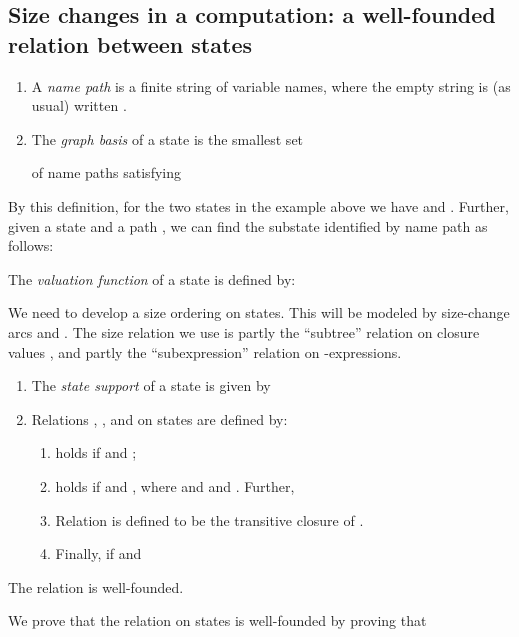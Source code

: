 \documentclass{LMCS}
\newcommand{\be}{\begin{enumerate}}
\newcommand{\ee}{\end{enumerate}}
\newcommand{\bdfn}{\begin{defi}}
\newcommand{\edfn}{\end{defi}}
\newcommand{\blem}{\begin{lem}}
\newcommand{\elem}{\end{lem}}
\theoremstyle{definition}\newtheorem{env}[thm]{Environment}
\begin{document}
\subsection{Size changes in a computation: a well-founded  relation between states}


\bdfn 
\label{def-graph-nodes}\hfill
\be[(1)]

\item A {\em name path} is  a finite string  of 
variable names, where the empty string is (as usual) written . 

\item The {\em graph basis} of a state  is the smallest set  
 
of name paths satisfying

\ee
\edfn
By this definition, for the two states in the example above we have
 and 
. Further, given a state  and a path , we can 
find the substate identified by name path  as follows: 

\bdfn 
\label{def-graph-valuation}
The {\em valuation function}
  of a state  
is defined by: 
 
\edfn
We need to develop a size ordering on states. 
This will  be modeled by size-change arcs
 and .
The size relation we use is partly the ``subtree'' relation on closure 
values , and partly the ``subexpression'' relation on 
-expressions.



\bdfn\label{def-value-decrease}\hfill

\be[(1)]

\item 
The {\em state support}  of 
a state  is given by


\item Relations  
, ,  and  on states are defined by:
\be[]

\item   holds if  and ; 

\item  holds if  and 
, where 
 and  and . Further, \\


\item Relation   is defined to be the transitive closure of 
. 

\item Finally,  if  and \\
\ee
\ee
\edfn

\blem\label{lem-well-founded}
The relation  is 
well-founded.
\elem

We prove that the relation  on states is well-founded
by proving that 
\end{document}
